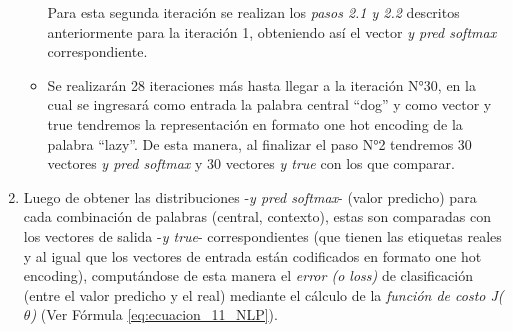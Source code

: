 \documentclass[12pt,a4paper]{article}
\begin{document}
\begin{sloppypar}
\begin{enumerate}
\begin{itemize}
Para esta segunda iteración se realizan los \textit{pasos 2.1 y 2.2} descritos anteriormente para la iteración 1, obteniendo así el vector \textit{y pred softmax} correspondiente.
 
\item Se realizarán 28 iteraciones más hasta llegar a la iteración N°30, en la cual se ingresará como entrada la palabra central “dog” y como vector y true tendremos la representación en formato one hot encoding de la palabra “lazy”. De esta manera, al finalizar el paso N°2 tendremos 30 vectores \textit{y pred softmax} y 30 vectores \textit{y true} con los que comparar.
\end{itemize}
      
\item Luego de obtener las distribuciones -\textit{y pred softmax}- (valor predicho) para cada combinación de palabras (central, contexto), estas son comparadas con los vectores de salida -\textit{y true}- correspondientes (que tienen las etiquetas reales y al igual que los vectores de entrada están codificados en formato one hot encoding), computándose de esta manera el \textit{error (o loss)} de clasificación (entre el valor predicho y el real) mediante el cálculo de la \textit{función de costo J($\theta$)} (Ver Fórmula \ref{eq:ecuacion_11_NLP}).


\end{enumerate}
\end{sloppypar}
\end{document}
